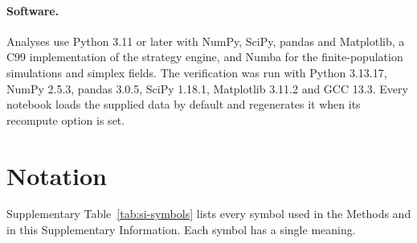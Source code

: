 \documentclass[fleqn,10pt]{wlscirep}
\theoremstyle{plain}
\begin{document}
\paragraph{Software.} Analyses use Python 3.11 or later with NumPy, SciPy, pandas and Matplotlib, a C99 implementation of the strategy engine, and Numba for the finite-population simulations and simplex fields. The verification was run with Python 3.13.17, NumPy 2.5.3, pandas 3.0.5, SciPy 1.18.1, Matplotlib 3.11.2 and GCC 13.3. Every notebook loads the supplied data by default and regenerates it when its recompute option is set.

\section{Notation}
\label{si:notation}

Supplementary Table~\ref{tab:si-symbols} lists every symbol used in the Methods and in this Supplementary Information. Each symbol has a single meaning.
\end{document}
